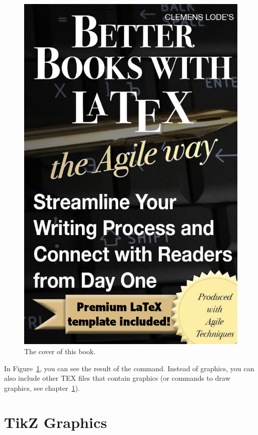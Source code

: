\begin{figure}[!ht]
	\centering
	\includegraphics{images/cover.jpg}
	\caption{The cover of this book.} \label{c1_cover:fig}
\end{figure}

In Figure~\ref{c1_cover:fig}, you can see the result of the command. Instead of
graphics, you can also include other TEX files that contain graphics (or
commands to draw graphics, see chapter~\ref{c1_tikzgraphics:sec}).


\section{TikZ Graphics}\label{c1_tikzgraphics:sec}

